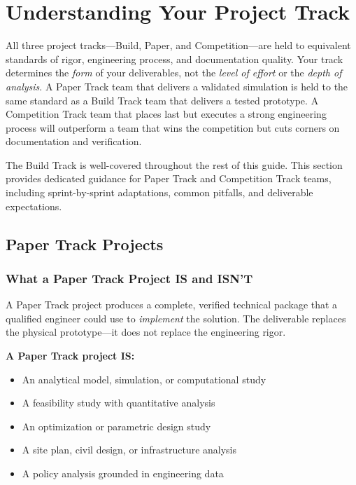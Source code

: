 \section{Understanding Your Project Track}

All three project tracks---Build, Paper, and Competition---are held to equivalent standards of rigor, engineering process, and documentation quality. Your track determines the \emph{form} of your deliverables, not the \emph{level of effort} or the \emph{depth of analysis}. A Paper Track team that delivers a validated simulation is held to the same standard as a Build Track team that delivers a tested prototype. A Competition Track team that places last but executes a strong engineering process will outperform a team that wins the competition but cuts corners on documentation and verification.

The Build Track is well-covered throughout the rest of this guide. This section provides dedicated guidance for Paper Track and Competition Track teams, including sprint-by-sprint adaptations, common pitfalls, and deliverable expectations.


\subsection{Paper Track Projects}

\subsubsection{What a Paper Track Project IS and ISN'T}

A Paper Track project produces a complete, verified technical package that a qualified engineer could use to \emph{implement} the solution. The deliverable replaces the physical prototype---it does not replace the engineering rigor.

\textbf{A Paper Track project IS:}
\begin{itemize}[nosep,leftmargin=1.5em]
\item An analytical model, simulation, or computational study
\item A feasibility study with quantitative analysis
\item An optimization or parametric design study
\item A site plan, civil design, or infrastructure analysis
\item A policy analysis grounded in engineering data
\end{itemize}

